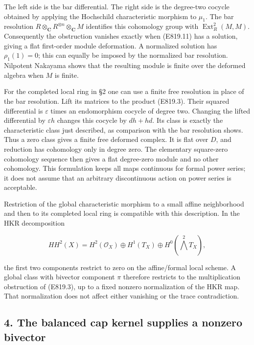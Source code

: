The left side is the bar differential. The right side is the degree-two
cocycle obtained by applying the Hochschild characteristic morphism to
\(\mu_1\). The bar resolution
\(R\otimes_{\mathbf C}R^{\otimes n}\otimes_{\mathbf C}M\) identifies
this cohomology group with \(\operatorname{Ext}^2_R(M,M)\). Consequently
the obstruction vanishes exactly when (E819.11) has a solution, giving a
flat first-order module deformation. A normalized solution has
\(\rho_1(1)=0\); this can equally be imposed by the normalized bar
resolution. Nilpotent Nakayama shows that the resulting module is finite
over the deformed algebra when \(M\) is finite.

For the completed local ring in §2 one can use a finite free resolution
in place of the bar resolution. Lift its matrices to the product
(E819.3). Their squared differential is \(\varepsilon\) times an
endomorphism cocycle of degree two. Changing the lifted differential by
\(\varepsilon h\) changes this cocycle by \(dh+hd\). Its class is
exactly the characteristic class just described, as comparison with the
bar resolution shows. Thus a zero class gives a finite free deformed
complex. It is flat over \(D\), and reduction has cohomology only in
degree zero. The elementary square-zero cohomology sequence then gives a
flat degree-zero module and no other cohomology. This formulation keeps
all maps continuous for formal power series; it does not assume that an
arbitrary discontinuous action on power series is acceptable.

Restriction of the global characteristic morphism to a small affine
neighborhood and then to its completed local ring is compatible with
this description. In the HKR decomposition

\[
 HH^2(X)=H^2(\mathcal O_X)\oplus H^1(T_X)
                \oplus H^0(\bigwedge^2T_X),
 \tag{E819.12}
\]

the first two components restrict to zero on the affine/formal local
scheme. A global class with bivector component \(\pi\) therefore
restricts to the multiplication obstruction of (E819.3), up to a fixed
nonzero normalization of the HKR map. That normalization does not affect
either vanishing or the trace contradiction.

\subsection{4. The balanced cap kernel supplies a nonzero
bivector}\label{SF-E819-the-balanced-cap-kernel-supplies-a-nonzero-bivector}

